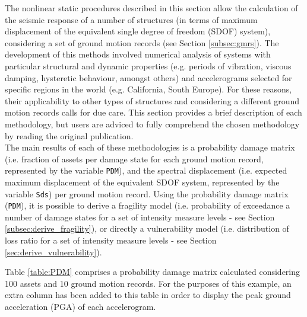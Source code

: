 The nonlinear static procedures described in this section allow the calculation of the seismic response of a number of structures (in terms of maximum displacement of the equivalent single degree of freedom (SDOF) system), considering a set of ground motion records (see Section \ref{subsec:gmrs}). The development of this methods involved numerical analysis of systems with particular structural and dynamic properties (e.g. periods of vibration, viscous damping, hysteretic behaviour, amongst others) and accelerograms selected for specific regions in the world (e.g. California, South Europe). For these reasons, their applicability to other types of structures and considering a different ground motion records calls for due care. This section provides a brief description of each methodology, but users are adviced to fully comprehend the chosen methodology by reading the original publication. \\

The main results of each of these methodologies is a probability damage matrix (i.e. fraction of assets per damage state for each ground motion record, represented by the variable \verb=PDM=), and the spectral displacement (i.e. expected maximum displacement of the equivalent SDOF system, represented by the variable \verb=Sds=) per ground motion record. Using the probability damage matrix (\verb=PDM=), it is possible to derive a fragility model (i.e. probability of exceedance a number of damage states for a set of intensity measure levels - see Section \ref{subsec:derive_fragility}), or directly a vulnerability model (i.e. distribution of loss ratio for a set of intensity measure levels - see Section \ref{sec:derive_vulnerability}).

Table \ref{table:PDM} comprises a probability damage matrix calculated considering 100 assets and 10 ground motion records. For the purposes of this example, an extra column has been added to this table in order to display the peak ground acceleration (PGA) of each accelerogram. 

